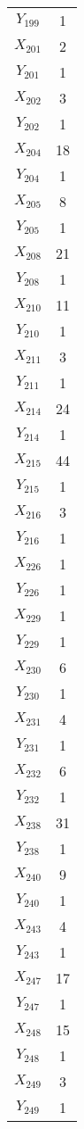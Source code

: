 \documentclass[a4paper,10pt]{article}
\begin{document}
\begin{center}
\begin{longtable}{cc}
$Y_{199}$ & 1 \\
$X_{201}$ & 2 \\
$Y_{201}$ & 1 \\
$X_{202}$ & 3 \\
$Y_{202}$ & 1 \\
$X_{204}$ & 18 \\
$Y_{204}$ & 1 \\
$X_{205}$ & 8 \\
$Y_{205}$ & 1 \\
$X_{208}$ & 21 \\
$Y_{208}$ & 1 \\
$X_{210}$ & 11 \\
$Y_{210}$ & 1 \\
$X_{211}$ & 3 \\
$Y_{211}$ & 1 \\
$X_{214}$ & 24 \\
$Y_{214}$ & 1 \\
$X_{215}$ & 44 \\
$Y_{215}$ & 1 \\
$X_{216}$ & 3 \\
$Y_{216}$ & 1 \\
$X_{226}$ & 1 \\
$Y_{226}$ & 1 \\
$X_{229}$ & 1 \\
$Y_{229}$ & 1 \\
$X_{230}$ & 6 \\
$Y_{230}$ & 1 \\
$X_{231}$ & 4 \\
$Y_{231}$ & 1 \\
$X_{232}$ & 6 \\
$Y_{232}$ & 1 \\
$X_{238}$ & 31 \\
$Y_{238}$ & 1 \\
$X_{240}$ & 9 \\
$Y_{240}$ & 1 \\
$X_{243}$ & 4 \\
$Y_{243}$ & 1 \\
$X_{247}$ & 17 \\
$Y_{247}$ & 1 \\
$X_{248}$ & 15 \\
$Y_{248}$ & 1 \\
$X_{249}$ & 3 \\
$Y_{249}$ & 1 \\
\end{longtable}
\end{center}
\end{document}
